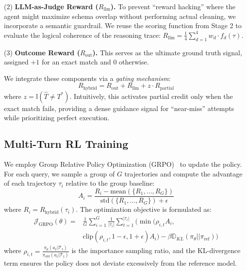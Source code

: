 \noindent (2) \textbf{LLM-as-Judge Reward ($R_{\text{llm}}$).} To prevent ``reward hacking'' where the agent might maximize schema overlap without performing actual cleaning, we incorporate a semantic guardrail. We reuse the scoring function from Stage 2 to evaluate the logical coherence of the reasoning trace: $R_{\text{llm}} = \frac{1}{4} \sum_{d=1}^{4} w_d \cdot f_d(\tau)$.

\noindent (3) \textbf{Outcome Reward ($R_{\text{out}}$).} This serves as the ultimate ground truth signal, assigned $+1$ for an exact match and $0$ otherwise.

We integrate these components via a \textit{gating mechanism}:
\begin{equation}
R_{\text{hybrid}} = R_{\text{out}} + R_{\text{llm}} + z \cdot R_{\text{partial}}
\end{equation}
where $z = \mathbb{I}(\hat{T} \neq T^*)$. Intuitively, this activates partial credit only when the exact match fails, providing a dense guidance signal for ``near-miss'' attempts while prioritizing perfect execution.

\subsection{Multi-Turn RL Training}
We employ Group Relative Policy Optimization (GRPO)~\cite{shao2024deepseekmath} to update the policy. For each query, we sample a group of $G$ trajectories and compute the advantage of each trajectory $\tau_i$ relative to the group baseline:
\begin{equation}
A_i = \frac{R_i - \text{mean}(\{R_1, \dots, R_G\})}{\text{std}(\{R_1, \dots, R_G\}) + \epsilon}
\end{equation}
where $R_i = R_{\text{hybrid}}(\tau_i)$. The optimization objective is formulated as:
\begin{equation}
\begin{split}
\mathcal{J}_{\text{GRPO}}(\theta) = & \frac{1}{G} \sum_{i=1}^G \frac{1}{|\tau_i|} \sum_{t=1}^{|\tau_i|} \Big( \min \Big( \rho_{i,t} A_i, \\
& \text{clip}(\rho_{i,t}, 1-\epsilon, 1+\epsilon) A_i \Big) - \beta \mathbb{D}_{KL}(\pi_\theta || \pi_{\text{ref}}) \Big)
\end{split}
\end{equation}
where $\rho_{i,t} = \frac{\pi_\theta(a_t | \mathcal{T}_t)}{\pi_{\text{old}}(a_t | \mathcal{T}_t)}$ is the importance sampling ratio, and the KL-divergence term ensures the policy does not deviate excessively from the reference model.

